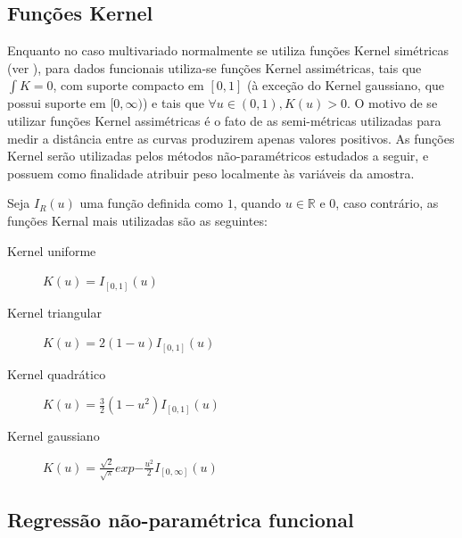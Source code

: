 \documentclass[
	12pt,				%
	openright,			%
	oneside,			%
	a4paper,			%
	english,			%
	brazil				%
	]{dissertacao-ufrgs-abntex2}
\begin{document}
\subsection{Funções Kernel}

Enquanto no caso multivariado normalmente se utiliza funções Kernel simétricas (ver ), para dados funcionais utiliza-se funções Kernel assimétricas, tais que $\int K = 0$, com suporte compacto em $[0,1]$ (à exceção do Kernel gaussiano, que possui suporte em $[0,\infty)$) e tais que $\forall u \in (0,1), K(u) > 0$. O motivo de se utilizar funções Kernel assimétricas é o fato de as semi-métricas utilizadas para medir a distância entre as curvas produzirem apenas valores positivos. As funções Kernel serão utilizadas pelos métodos não-paramétricos estudados a seguir, e possuem como finalidade atribuir peso localmente às variáveis da amostra.

Seja $I_R(u)$ uma função definida como $1$, quando $u \in \mathbb{R}$ e 0, caso contrário, as funções Kernal mais utilizadas são as seguintes:
\begin{description}
	\item[Kernel uniforme] $K(u)= I_{[0,1]}(u)$
    \item[Kernel triangular] $K(u)= 2(1-u)I_{[0,1]}(u)$
    \item[Kernel quadrático] $K(u)= \frac {3}{2} (1 - u^2) I_{[0,1]}(u)$
    \item[Kernel gaussiano] $K(u)= \frac {\sqrt{2}}{\sqrt{\pi}} exp{-\frac{u^2}{2}} I_{[0,\infty]}(u)$
\end{description}

\subsection{Regressão não-paramétrica funcional}
\label{metodos-previsao-npfda}
\end{document}

